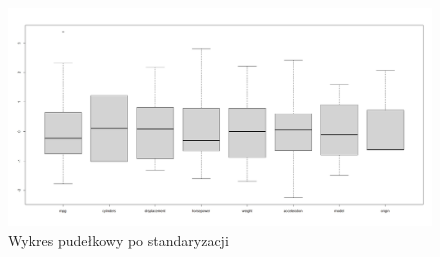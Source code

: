 \documentclass{article}
\begin{document}
            \begin{figure}[H]
                \caption{Wykres pudełkowy po standaryzacji}
                \centering
                \includegraphics[width=\textwidth]{../boxplots/boxplot_scale_fig.jpeg}
            \end{figure}
\end{document}
